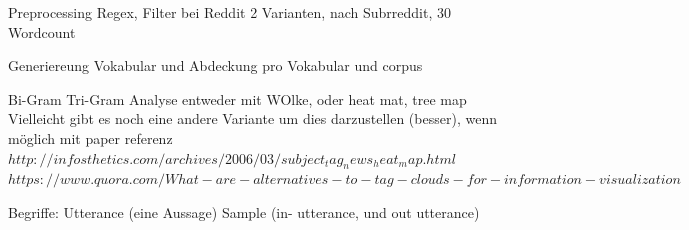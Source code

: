 Preprocessing
Regex, Filter bei Reddit 2 Varianten, nach Subrreddit, 30 Wordcount


Generiereung Vokabular und Abdeckung pro Vokabular und corpus

Bi-Gram Tri-Gram Analyse entweder mit WOlke, oder heat mat, tree map
Vielleicht gibt es noch eine andere Variante um dies darzustellen (besser), wenn möglich mit paper referenz
$http://infosthetics.com/archives/2006/03/subject_tag_news_heat_map.html$
$https://www.quora.com/What-are-alternatives-to-tag-clouds-for-information-visualization$

Begriffe: Utterance (eine Aussage)
			Sample (in- utterance, und out utterance)
			
